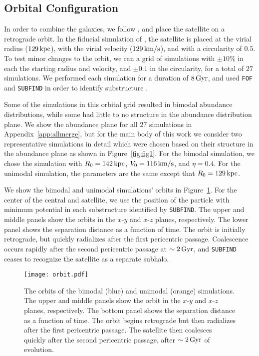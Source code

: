 \subsection{Orbital Configuration}\label{ssec:orbit_setup}
In order to combine the galaxies, we follow \citet{2021ApJ...923...92N}, and place the satellite on a retrograde orbit. In the fiducial simulation of \citet{2021ApJ...923...92N}, the satellite is placed at the virial radius ($129\,\textrm{kpc}$), with the virial velocity ($129\,\textrm{km}/\textrm{s}$), and with a circularity of $0.5$. To test minor changes to the orbit, we ran a grid of simulations with $\pm10\%$ in each the starting radius and velocity, and $\pm0.1$ in the circularity, for a total of $27$ simulations. We performed each simulation for a duration of $8\,\textrm{Gyr}$, and used \texttt{FOF} and \texttt{SUBFIND} in order to identify substructure \citep{2005Natur.435..629S,2009MNRAS.399..497D}.

Some of the simulations in this orbital grid resulted in bimodal abundance distributions, while some had little to no structure in the abundance distribution plane. We show the abundance plane for all $27$ simulations in Appendix~\ref{app:allmerge}, but for the main body of this work we consider two representative simulations in detail which were chosen based on their structure in the abundance plane as shown in Figure~\ref{fig:fig1}. For the bimodal simulation, we chose the simulation with $R_0=142\,\textrm{kpc}$, $V_0=116\,\textrm{km}/\textrm{s}$, and $\eta=0.4$. For the unimodal simulation, the parameters are the same except that $R_0=129\,\textrm{kpc}$.

We show the bimodal and unimodal simulations' orbits in Figure~\ref{fig:orbit}. For the center of the central and satellite, we use the position of the particle with minimum potential in each substructure identified by \texttt{SUBFIND}. The upper and middle panels show the orbits in the $x$-$y$ and $x$-$z$ planes, respectively. The lower panel shows the separation distance as a function of time. The orbit is initially retrograde, but quickly radializes after the first pericentric passage. Coalescence occurs rapidly after the second pericentric passage at $\sim2\,\textrm{Gyr}$, and \texttt{SUBFIND} ceases to recognize the satellite as a separate subhalo.

\begin{figure}
    \centering
    \texttt{[image: orbit.pdf]}
    \caption{The orbits of the bimodal (blue) and unimodal (orange) simulations. The upper and middle panels show the orbit in the $x$-$y$ and $x$-$z$ planes, respectively. The bottom panel shows the separation distance as a function of time. The orbit begins retrograde but then radializes after the first pericentric passage. The satellite then coalesces quickly after the second pericentric passage, after $\sim2\,\textrm{Gyr}$ of evolution.}
    \label{fig:orbit}
\end{figure}

